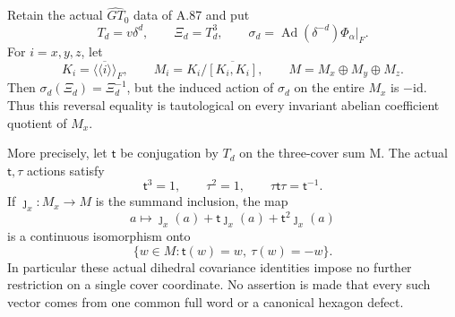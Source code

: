 Retain the actual \(\widehat{GT}_0\) data of A.87 and put
\[
 T_d=v\delta^d,\qquad \Xi_d=T_d^3,\qquad
 \sigma_d=\operatorname{Ad}(\delta^{-d})\Phi_\alpha|_F.
 \tag{A.91.1}
\]
For \(i=x,y,z\), let
\[
 K_i=\overline{\langle\!\langle i\rangle\!\rangle}_F,\qquad
 M_i=K_i/\overline{[K_i,K_i]},\qquad
 M=M_x\oplus M_y\oplus M_z.
 \tag{A.91.2}
\]
Then \(\sigma_d(\Xi_d)=\Xi_d^{-1}\), but the induced action
of \(\sigma_d\) on the entire \(M_x\) is \(-\mathrm{id}\).
Thus this reversal equality is tautological on every
invariant abelian coefficient quotient of \(M_x\).

More precisely, let \(\mathsf t\) be conjugation by \(T_d\)
on the three-cover sum M. The actual \(\mathsf t,\tau\)
actions satisfy
\[
 \mathsf t^3=1,\qquad \tau^2=1,\qquad
 \tau\mathsf t\tau=\mathsf t^{-1}.
 \tag{A.91.3}
\]
If \(\jmath_x:M_x\to M\) is the summand inclusion, the map
\[
 a\longmapsto
 \jmath_x(a)+\mathsf t\jmath_x(a)+\mathsf t^2\jmath_x(a)
 \tag{A.91.4}
\]
is a continuous isomorphism onto
\[
             \{w\in M:\mathsf t(w)=w,\ \tau(w)=-w\}.
 \tag{A.91.5}
\]
In particular these actual dihedral covariance identities
impose no further restriction on a single cover coordinate.
No assertion is made that every such vector comes from one
common full word or a canonical hexagon defect.

